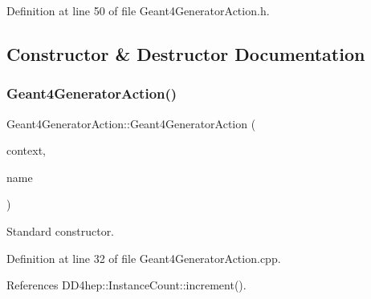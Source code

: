 Definition at line 50 of file Geant4\+Generator\+Action.\+h.



\subsection{Constructor \& Destructor Documentation}
\hypertarget{class_d_d4hep_1_1_simulation_1_1_geant4_generator_action_aa172a80d58e0f0c1d62bad456233fcf0}{}\label{class_d_d4hep_1_1_simulation_1_1_geant4_generator_action_aa172a80d58e0f0c1d62bad456233fcf0} 
\subsubsection{\texorpdfstring{Geant4\+Generator\+Action()}{Geant4GeneratorAction()}}
{\footnotesize\ttfamily Geant4\+Generator\+Action\+::\+Geant4\+Generator\+Action (\begin{DoxyParamCaption}\item[{\hyperlink{class_d_d4hep_1_1_simulation_1_1_geant4_context}{Geant4\+Context} $\ast$}]{context,  }\item[{const std\+::string \&}]{name }\end{DoxyParamCaption})}



Standard constructor. 



Definition at line 32 of file Geant4\+Generator\+Action.\+cpp.



References D\+D4hep\+::\+Instance\+Count\+::increment().

\hypertarget{class_d_d4hep_1_1_simulation_1_1_geant4_generator_action_a4b70fe9a48775ddf6853ff699606430d}{}\label{class_d_d4hep_1_1_simulation_1_1_geant4_generator_action_a4b70fe9a48775ddf6853ff699606430d} 
